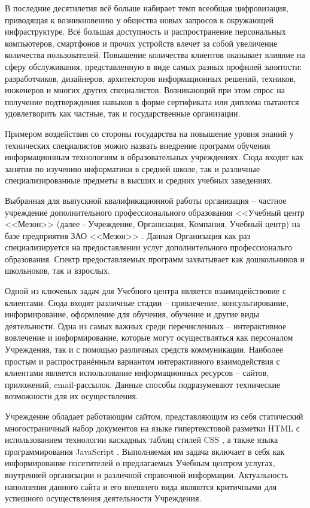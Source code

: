 
В последние десятилетия всё больше набирает темп всеобщая цифровизация, приводящая к возникновению у общества новых запросов к окружающей инфраструктуре.
Всё большая доступность и распространение персональных компьютеров, смартфонов и прочих устройств влечет за собой увеличение количества пользователей.
Повышение количества клиентов оказывает влияние на сферу обслуживания, представленную в виде самых разных профилей занятости: разработчиков, дизайнеров, архитекторов информационных решений, техников, инженеров и многих других специалистов.
Возникающий при этом спрос на получение подтверждения навыков в форме сертификата или диплома пытаются удовлетворить как частные, так и государственные организации.

Примером воздействия со стороны государства на повышение уровня знаний у технических специалистов можно назвать внедрение программ обучения информационным технологиям в образовательных учреждениях.
Сюда входят как занятия по изучению информатики в средней школе, так и различные специализированные предметы в высших и средних учебных заведениях.

Выбранная для выпускной квалификационной работы организация -- частное учреждение дополнительного профессионального образования <<Учебный центр <<Мезон>> \cite{meson-uc} (далее - Учреждение, Организация, Компания, Учебный центр) на базе предприятия ЗАО <<Мезон>> \cite{meson}.
Данная Организация как раз специализируется на предоставлении услуг дополнительного профессиональго образования.
Спектр предоставляемых программ захватывает как дошкольников и школьноков, так и взрослых.

Одной из ключевых задач для Учебного центра является взаимодействовие с клиентами.
Сюда входят различные стадии -- привлечение, консультирование, информирование, оформление для обучения, обучение и другие виды деятельности.
Одна из самых важных среди перечисленных -- интерактивное вовлечение и информирование, которые могут осуществляться как персоналом Учреждения, так и с помощью различных средств коммуникации.
Наиболее простым и распространённым вариантом интерактивного взаимодействия с клиентами является использование информационных ресурсов -- сайтов, приложений, email-рассылок.
Данные способы подразумевают технические возможности для их осуществления.

Учреждение обладает работающим сайтом, представляющим из себя статический многостраничный набор документов на языке гипертекстовой разметки HTML \cite{wiki-html} с использованием технологии каскадных таблиц стилей CSS \cite{wiki-css}, а также языка программирования JavaScript \cite{wiki-js}.
Выполняемая им задача включает в себя как информирование посетителей о предлагаемых Учебным центром услугах, внутренней организации и различной справочной информации.
Актуальность наполнения данного сайта и его внешнего вида являются критичными для успешного осуществления деятельности Учреждения.

